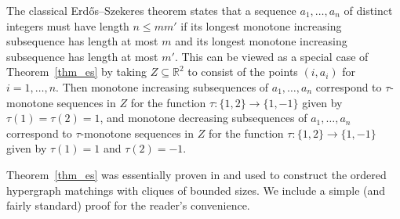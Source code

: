 \documentclass[11pt]{article}
\theoremstyle{definition}
\numberwithin{equation}{section}
\numberwithin{figure}{section}
\newcommand{\su}{\subseteq}
\begin{document}
The classical Erd{\H o}s--Szekeres theorem states that a sequence $a_1, \ldots, a_{n}$ of distinct integers must have length $n\le mm'$ if its longest monotone increasing subsequence has length at most $m$ and its longest monotone increasing subsequence has length at most $m'$. This can be viewed as a special case of Theorem~\ref{thm_es} by taking $Z\su \mathbb{R}^2$ to consist of the points $(i,a_i)$ for $i=1, \ldots, n$. Then monotone increasing subsequences of $a_1, \ldots, a_{n}$ correspond to $\tau$-monotone sequences in $Z$ for the function $\tau:\{1, 2\} \rightarrow \{1,-1\}$ given by $\tau(1)=\tau(2)=1$, and monotone decreasing subsequences of $a_1, \ldots, a_{n}$ correspond to $\tau$-monotone sequences in $Z$ for the function $\tau:\{1, 2\} \rightarrow \{1,-1\}$ given by $\tau(1)=1$ and $\tau(2)=-1$.

Theorem~\ref{thm_es} was essentially proven in \cite{DGR} and used to construct the ordered hypergraph matchings with cliques of bounded sizes. We include a simple (and fairly standard) proof for the reader's convenience.
\end{document}
